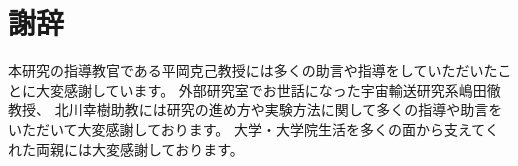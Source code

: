 \chapter*{謝辞}
本研究の指導教官である平岡克己教授には多くの助言や指導をしていただいたことに大変感謝しています。
外部研究室でお世話になった宇宙輸送研究系嶋田徹教授、
北川幸樹助教には研究の進め方や実験方法に関して多くの指導や助言をいただいて大変感謝しております。
大学・大学院生活を多くの面から支えてくれた両親には大変感謝しております。
